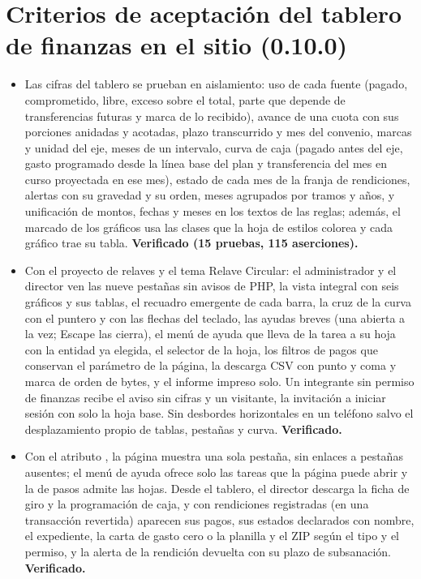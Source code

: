 \documentclass[11pt,a4paper]{article}
\begin{document}
\section{Criterios de aceptación del tablero de finanzas en el sitio (0.10.0)}

\begin{itemize}
\item Las cifras del tablero se prueban en aislamiento: uso de cada fuente (pagado, comprometido, libre, exceso sobre el total, parte que depende de transferencias futuras y marca de lo recibido), avance de una cuota con sus porciones anidadas y acotadas, plazo transcurrido y mes del convenio, marcas y unidad del eje, meses de un intervalo, curva de caja (pagado antes del eje, gasto programado desde la línea base del plan y transferencia del mes en curso proyectada en ese mes), estado de cada mes de la franja de rendiciones, alertas con su gravedad y su orden, meses agrupados por tramos y años, y unificación de montos, fechas y meses en los textos de las reglas; además, el marcado de los gráficos usa las clases que la hoja de estilos colorea y cada gráfico trae su tabla. \textbf{Verificado (15 pruebas, 115 aserciones).}
\item Con el proyecto de relaves y el tema Relave Circular: el administrador y el director ven las nueve pestañas sin avisos de PHP, la vista integral con seis gráficos y sus tablas, el recuadro emergente de cada barra, la cruz de la curva con el puntero y con las flechas del teclado, las ayudas breves (una abierta a la vez; Escape las cierra), el menú de ayuda que lleva de la tarea a su hoja con la entidad ya elegida, el selector de la hoja, los filtros de pagos que conservan el parámetro de la página, la descarga CSV con punto y coma y marca de orden de bytes, y el informe impreso solo. Un integrante sin permiso de finanzas recibe el aviso sin cifras y un visitante, la invitación a iniciar sesión con solo la hoja base. Sin desbordes horizontales en un teléfono salvo el desplazamiento propio de tablas, pestañas y curva. \textbf{Verificado.}
\item Con el atributo , la página muestra una sola pestaña, sin enlaces a pestañas ausentes; el menú de ayuda ofrece solo las tareas que la página puede abrir y la de pasos admite las hojas. Desde el tablero, el director descarga la ficha de giro y la programación de caja, y con rendiciones registradas (en una transacción revertida) aparecen sus pagos, sus estados declarados con nombre, el expediente, la carta de gasto cero o la planilla y el ZIP según el tipo y el permiso, y la alerta de la rendición devuelta con su plazo de subsanación. \textbf{Verificado.}
\end{itemize}
\end{document}
